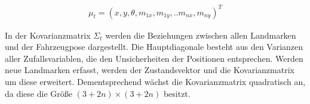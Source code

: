 \begin{align}
\mu_t = (x,y,\theta,m_{1x},m_{1y},..m_{nx},m_{ny})^T
\end{align}



In der Kovarianzmatrix $ \Sigma_t $ werden die Beziehungen zwischen allen Landmarken und der Fahrzeugpose dargestellt. Die Hauptdiagonale besteht aus den Varianzen aller Zufallsvariablen, die den Unsicherheiten der Positionen entsprechen. Werden neue Landmarken erfasst, werden der Zustandsvektor und die Kovarianzmatrix um diese erweitert. Dementsprechend wächst die Kovarianzmatrix quadratisch an, da diese die Größe $(3+2n) \times (3+2n)$ besitzt.
%

